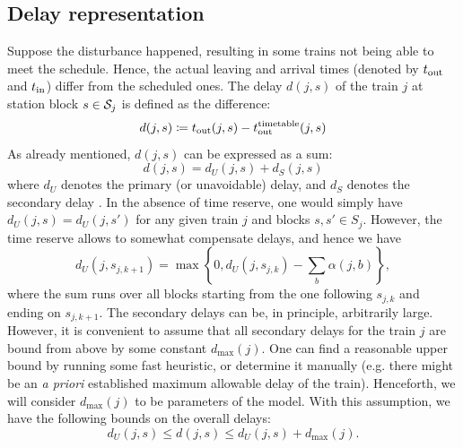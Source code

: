 \subsection{Delay representation}
Suppose the disturbance happened, resulting in some trains not being able to
meet the schedule. Hence, the actual leaving and arrival times (denoted by
$t_\text{out}$ and $t_\text{in}$) differ from the scheduled ones. The delay $d(j, s)$ of the
train $j$ at station block $s \in \mathcal{S}_j$ is defined as the difference:
\begin{equation}
  \label{eq:djs}
  d(j, s) \coloneqq \tout(j, s) - \ttout(j, s) %
\end{equation}
As already mentioned, $d(j, s)$ can be expressed as a sum:
\begin{equation}
  d(j, s) = d_U(j, s) + d_S(j, s)
\end{equation}
where $d_U$ denotes the primary (or unavoidable) delay, and $d_S$ denotes the
secondary delay \cite{dariano}. In the absence of time reserve, one would simply have $d_U(j,
  s) = d_U(j, s')$ for any given train $j$ and blocks $s,s' \in S_{j}$. However,
    the time reserve allows to somewhat compensate delays, and hence we have
    \begin{equation}
      d_U(j, s_{j,k+1}) = \max\left\{0, d_U(j, s_{j,k}) - \sum_{b}\alpha(j, b)\right\},
    \end{equation}
    where the sum runs over all blocks starting from the one following $s_{j,k}$
    and ending on $s_{j,k+1}$. The secondary delays can be, in principle,
    arbitrarily large. However, it is convenient to assume that all secondary
    delays for the train $j$ are bound from above by some constant $d_{\max}(j)$.
One can find a reasonable upper bound by running some fast heuristic, or
determine it manually (e.g. there might be an \emph{a priori} established
maximum allowable delay of the train). Henceforth, we will consider
$d_{\max}(j)$ to be parameters of the model. With this assumption, we have the
following bounds on the overall delays:
\begin{equation}
  d_U(j, s) \le d(j, s) \le d_U(j, s) + d_{\max}(j).
\end{equation}

